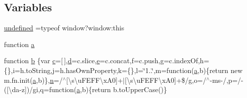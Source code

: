 \subsection*{Variables}
\begin{DoxyCompactItemize}
\item 
\hyperlink{application_2assets_2js_2jquery-1_811_82_8min_8js_ae21cc36bf0d65014c717a481a3f8a468}{undefined} =typeof window?window\+:this
\item 
function \hyperlink{application_2assets_2js_2jquery-1_811_82_8min_8js_aa4d4888597588a84fd5b1184d00c91f3}{a}
\item 
function \hyperlink{application_2assets_2js_2jquery-1_811_82_8min_8js_ac0431efac4d7c393d1e70b86115cb93f}{b} \{var \hyperlink{assets_2js_2bootstrap_8min_8js_ad9d1ac02e33c4aed62ad517a7cb8b3fb}{c}=\mbox{[}$\,$\mbox{]},\hyperlink{assets_2js_2bootstrap_8min_8js_aeb337d295abaddb5ec3cb34cc2e2bbc9}{d}=c.\+slice,\hyperlink{assets_2js_2bootstrap_8min_8js_ab5902775854a8b8440bcd25e0fe1c120}{e}=c.\+concat,f=c.\+push,g=c.\+index\+Of,h=\{\},i=h.\+to\+String,j=h.\+has\+Own\+Property,k=\{\},l=\char`\"{}1..\char`\"{},m=function(\hyperlink{assets_2js_2bootstrap_8min_8js_a1f5870dcf487187f13d5fd328ed9e6e7}{a},b)\{return new m.\+fn.\+init(\hyperlink{assets_2js_2bootstrap_8min_8js_a1f5870dcf487187f13d5fd328ed9e6e7}{a},b)\},\hyperlink{cli_2error__general_8php_ace0fd03cd383f20ce6ea63247a207294}{n}=/$^\wedge$\mbox{[}\textbackslash{}s\textbackslash{}u\+F\+E\+F\+F\textbackslash{}x\+A0\mbox{]}+$\vert$\mbox{[}\textbackslash{}s\textbackslash{}u\+F\+E\+F\+F\textbackslash{}x\+A0\mbox{]}+\$/g,o=/$^\wedge$-\/ms-\//,p=/-\/(\mbox{[}\textbackslash{}da-\/z\mbox{]})/gi,q=function(\hyperlink{assets_2js_2bootstrap_8min_8js_a1f5870dcf487187f13d5fd328ed9e6e7}{a},b)\{return b.\+to\+Upper\+Case()\}
\item 

\end{DoxyCompactItemize}
